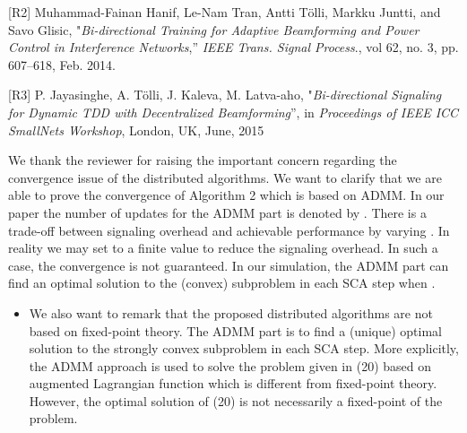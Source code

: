 \begin{enumerate}
	\vspace{1eM}
	[R2] Muhammad-Fainan Hanif, Le-Nam Tran, Antti T\"{o}lli, Markku Juntti,  and Savo Glisic, "\emph{Bi-directional Training for Adaptive Beamforming and Power Control in Interference Networks},'' \textit{IEEE Trans. Signal Process}., vol 62, no. 3, pp. 607--618, Feb. 2014. 
	
	[R3] P. Jayasinghe, A. T\"{o}lli, J. Kaleva,  M. Latva-aho, "\emph{Bi-directional Signaling for Dynamic TDD with Decentralized Beamforming}'', in \textit{Proceedings of IEEE ICC SmallNets Workshop}, London, UK, June, 2015		
	\vspace{1eM}
			
 

\resp We thank the reviewer for raising the important concern regarding the convergence issue of the distributed algorithms. We want to clarify that we are able to prove the convergence of Algorithm 2 which is based on \ac{ADMM}. In our paper the number of updates for the \ac{ADMM} part is denoted by . There is a trade-off between signaling overhead and achievable performance by varying . In reality we may set  to a finite value to reduce the signaling overhead. In such a case, the convergence is not guaranteed. In our simulation, the \ac{ADMM} part can find an optimal solution to the (convex) subproblem in each \ac{SCA} step when .

\begin{itemize}
\item We also want to remark that  the proposed distributed algorithms are not based on fixed-point theory. The \ac{ADMM} part is to find a (unique) optimal solution to the strongly convex subproblem in each \ac{SCA} step. More explicitly, the \ac{ADMM} approach is used to solve the problem given in (20) based on augmented Lagrangian function which is different from fixed-point theory. However, the optimal solution of (20) is not necessarily a fixed-point of the problem. 


\end{itemize}
\end{enumerate}
